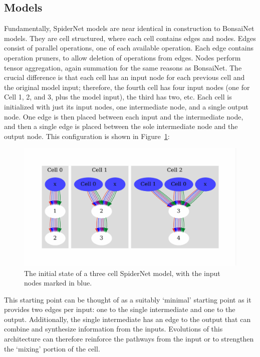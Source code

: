 \subsection{Models}
Fundamentally, SpiderNet models are near identical in construction to BonsaiNet models. They are cell structured, where each
cell contains edges and nodes. Edges consist of parallel operations, one of each available operation. Each edge contains
operation pruners, to allow deletion of operations from edges. Nodes perform
tensor aggregation, again summation for the same reasons as BonsaiNet. The crucial difference is that each cell has an input
node for each previous cell and the original model input; therefore, the fourth cell has four input nodes
(one for Cell 1, 2, and 3, plus the model input), the third has two, etc. Each cell is
initialized with just its input nodes, one intermediate node, and a single output node. One edge is then placed between
each input and the intermediate node, and then a single edge is placed between the sole intermediate node and the output node.
This configuration is shown in Figure~\ref{fig:spider_multiin_initialization}:
\begin{figure}[ht!]
    \centering
  \includegraphics[width=.85\textwidth, trim={0 1.5cm 0 1.5cm}, clip]{graphs/initial_darkerblue}
    \caption[The initial state of a three cell SpiderNet model]{The initial state of a three cell SpiderNet model, with the input nodes marked in blue.}
    \label{fig:spider_multiin_initialization}
\end{figure}

This starting point can be thought of
as a suitably `minimal' starting point as it provides two edges per input: one to the single intermediate and one to the
output. Additionally, the single intermediate has an edge to the output that can combine and synthesize information from the inputs.
Evolutions of this architecture can therefore reinforce the pathways from the input or to strengthen the `mixing' portion of the cell.

